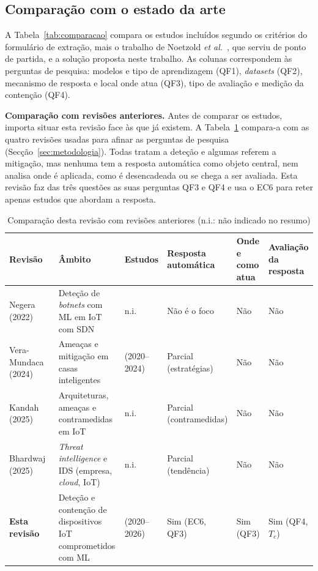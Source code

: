 \documentclass[conference,a4paper]{IEEEtran}
\begin{document}
\subsection{Comparação com o estado da arte}

A Tabela~\ref{tab:comparacao} compara os estudos incluídos segundo os critérios do
formulário de extração, mais o trabalho de Noetzold \textit{et al.}~\cite{noetzold2026anomaly},
que serviu de ponto de partida, e a solução proposta neste trabalho. As colunas
correspondem às perguntas de pesquisa: modelos e tipo de aprendizagem (QF1),
\textit{datasets} (QF2), mecanismo de resposta e local onde atua (QF3), tipo de avaliação
e medição da contenção (QF4).

\textbf{Comparação com revisões anteriores.} Antes de comparar os estudos, importa
situar esta revisão face às que já existem. A Tabela~\ref{tab:revisoes} compara-a com as
quatro revisões usadas para afinar as perguntas de pesquisa
(Secção~\ref{sec:metodologia}). Todas tratam a deteção e algumas referem a mitigação, mas
nenhuma tem a resposta automática como objeto central, nem analisa onde é aplicada, como
é desencadeada ou se chega a ser avaliada. Esta revisão faz das três questões as suas
perguntas QF3 e QF4 e usa o EC6 para reter apenas estudos que abordam a resposta.

\begin{table}[H]
\caption{Comparação desta revisão com revisões anteriores (n.i.: não indicado no resumo)}\label{tab:revisoes}
\centering\scriptsize
\setlength{\tabcolsep}{2.5pt}
\begin{tabular}{@{}>{\raggedright\arraybackslash}p{}>{\raggedright\arraybackslash}p{}>{\raggedright\arraybackslash}p{}>{\raggedright\arraybackslash}p{}>{\raggedright\arraybackslash}p{}>{\raggedright\arraybackslash}p{}@{}}
\toprule
Revisão & Âmbito & Estudos & Resposta automática & Onde e como atua & Avaliação da resposta \\
\midrule
Negera~\cite{negera2022review} (2022) & Deteção de \textit{botnets} com ML em IoT com SDN & n.i. & Não é o foco & Não & Não \\
Vera-Mundaca~\cite{veramundaca2024cybersecurity} (2024) & Ameaças e mitigação em casas inteligentes & 49 (2020--2024) & Parcial (estratégias) & Não & Não \\
Kandah~\cite{kandah2025navigating} (2025) & Arquiteturas, ameaças e contramedidas em IoT & n.i. & Parcial (contramedidas) & Não & Não \\
Bhardwaj~\cite{bhardwaj2025systematic} (2025) & \textit{Threat intelligence} e IDS (empresa, \textit{cloud}, IoT) & n.i. & Parcial (tendência) & Não & Não \\
\midrule
\textbf{Esta revisão} & Deteção e contenção de dispositivos IoT comprometidos com ML & 31 (2020--2026) & Sim (EC6, QF3) & Sim (QF3) & Sim (QF4, $T_c$) \\
\bottomrule
\end{tabular}
\end{table}
\end{document}
